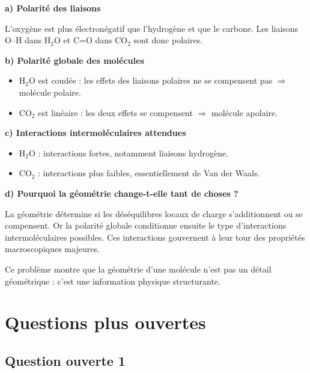 \documentclass[11pt,a4paper]{article}
\begin{document}
\begin{corrigebox}
\textbf{a) Polarité des liaisons}

L'oxygène est plus électronégatif que l'hydrogène et que le carbone.  
Les liaisons O--H dans \(\mathrm{H_2O}\) et C=O dans \(\mathrm{CO_2}\) sont donc polaires.

\textbf{b) Polarité globale des molécules}

\begin{itemize}
    \item \(\mathrm{H_2O}\) est coudée : les effets des liaisons polaires ne se compensent pas \(\Rightarrow\) molécule polaire.
    \item \(\mathrm{CO_2}\) est linéaire : les deux effets se compensent \(\Rightarrow\) molécule apolaire.
\end{itemize}

\textbf{c) Interactions intermoléculaires attendues}

\begin{itemize}
    \item \(\mathrm{H_2O}\) : interactions fortes, notamment liaisons hydrogène.
    \item \(\mathrm{CO_2}\) : interactions plus faibles, essentiellement de Van der Waals.
\end{itemize}

\textbf{d) Pourquoi la géométrie change-t-elle tant de choses ?}

La géométrie détermine si les déséquilibres locaux de charge s'additionnent ou se compensent.  
Or la polarité globale conditionne ensuite le type d'interactions intermoléculaires possibles.  
Ces interactions gouvernent à leur tour des propriétés macroscopiques majeures.

\begin{bilanbox}
Ce problème montre que la géométrie d'une molécule n'est pas un détail géométrique : c'est une information physique structurante.
\end{bilanbox}
\end{corrigebox}

\section{Questions plus ouvertes}

\subsection{Question ouverte 1}
\end{document}
